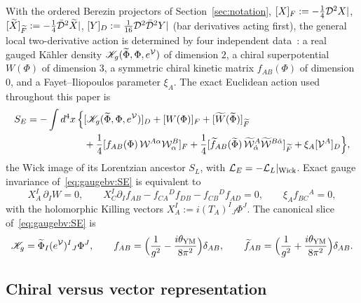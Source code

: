 With the ordered Berezin projectors of Section~\ref{sec:notation}, $[X]_F:=-\tfrac14\mathcal{D}^2X|$, $[\widetilde X]_{\widetilde F}:=-\tfrac14\bar{\mathcal{D}}^2\widetilde X|$, $[Y]_D:=\tfrac1{16}\mathcal{D}^2\bar{\mathcal{D}}^2Y|$ (bar derivatives acting first), the general local two-derivative action is determined by four independent data~\cite{WeinbergIII,GGRS}: a real gauged K\"ahler density $\mathscr K_g(\widetilde\Phi,\Phi,e^{\mathcal{V}})$ of dimension $2$, a chiral superpotential $W(\Phi)$ of dimension $3$, a symmetric chiral kinetic matrix $f_{AB}(\Phi)$ of dimension $0$, and a Fayet--Iliopoulos parameter $\xi_A$. The exact Euclidean action used throughout this paper is
\begin{equation}\label{eq:gaugebv:SE}
\begin{aligned}
S_E=-\int d^4x\,\Big\{&
[\mathscr K_g(\widetilde\Phi,\Phi,e^{\mathcal{V}})]_D
+[W(\Phi)]_F+[\widetilde W(\widetilde\Phi)]_{\widetilde F}\\
&+\frac14[f_{AB}(\Phi)\,\mathcal{W}^{A\alpha}\mathcal{W}^B_\alpha]_F
+\frac14[\widetilde f_{AB}(\widetilde\Phi)\,\widetilde{\mathcal{W}}^A_{\dot\alpha}\widetilde{\mathcal{W}}^{B\dot\alpha}]_{\widetilde F}
+\xi_A[\mathcal{V}^A]_D\Big\},
\end{aligned}
\end{equation}
the Wick image of its Lorentzian ancestor $S_L$, with $\mathcal L_E=-\mathcal L_L|_{\rm Wick}$. Exact gauge invariance of~\eqref{eq:gaugebv:SE} is equivalent to
\begin{equation}\label{eq:gaugebv:invariance}
X_A^I\,\partial_IW=0,\qquad
X_C^I\partial_If_{AB}-f_{CA}{}^Df_{DB}-f_{CB}{}^Df_{AD}=0,\qquad
\xi_Af_{BC}{}^A=0,
\end{equation}
with the holomorphic Killing vectors $X_A^I:=i(T_A)^I{}_J\Phi^J$. The canonical slice of~\eqref{eq:gaugebv:SE} is
\begin{equation}\label{eq:gaugebv:canonical}
\mathscr K_g=\widetilde\Phi_I(e^{\mathcal{V}})^I{}_J\Phi^J,\qquad
f_{AB}=\Bigl(\frac1{g^2}-\frac{i\theta_{\rm YM}}{8\pi^2}\Bigr)\delta_{AB},\qquad
\widetilde f_{AB}=\Bigl(\frac1{g^2}+\frac{i\theta_{\rm YM}}{8\pi^2}\Bigr)\delta_{AB}.
\end{equation}

\subsection{Chiral versus vector representation}\label{sec:gaugebv:frames}

